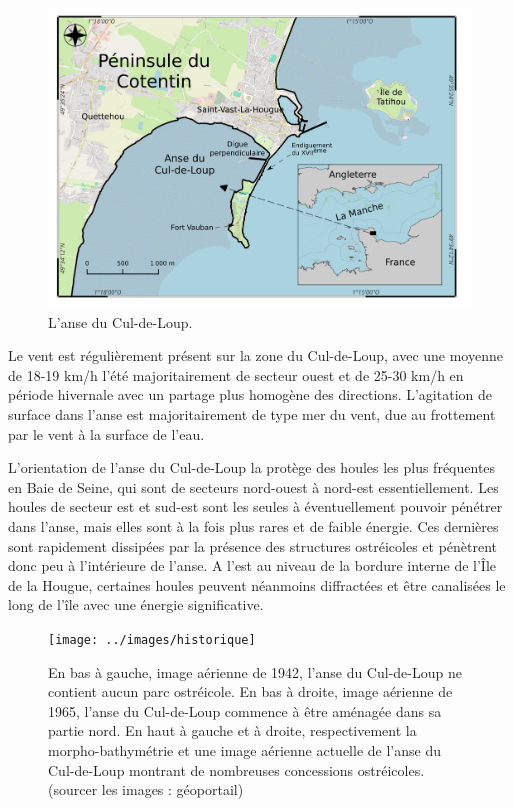 \documentclass[10pt,a4paper,titlepage]{article}
\begin{document}
\begin{figure}[!h]
    \centering
    \includegraphics[width=0.8\linewidth]{../images/carte-ADCL}
    \caption[Anse du Cul-de-Loup.]{L'anse du Cul-de-Loup.}
    \label{fig:carte-adcl}
\end{figure}

Le vent est régulièrement présent sur la zone du Cul-de-Loup, avec une moyenne de 18-19 km/h l'été majoritairement de secteur ouest et de 25-30 km/h en période hivernale avec un partage plus homogène des directions. L'agitation de surface dans l'anse est majoritairement de type mer du vent, due au frottement par le vent à la surface de l'eau.

L'orientation de l'anse du Cul-de-Loup la protège des houles les plus fréquentes en Baie de Seine, qui sont de secteurs nord-ouest à nord-est essentiellement. Les houles de secteur est et sud-est sont les seules à éventuellement pouvoir pénétrer dans l'anse, mais elles sont à la fois plus rares et de faible énergie. Ces dernières sont rapidement dissipées par la présence des structures ostréicoles et pénètrent donc peu à l'intérieure de l'anse. A l'est au niveau de la bordure interne de l'Île de la Hougue, certaines houles peuvent néanmoins diffractées et être canalisées le long de l'île avec une énergie significative.

\begin{figure}[!h]
    \centering
    \texttt{[image: ../images/historique]}
    \caption[Évolution de l'anse du Cul-de-Loup]{En bas à gauche, image aérienne de 1942, l'anse du Cul-de-Loup ne contient aucun parc ostréicole. En bas à droite, image aérienne de 1965, l'anse du Cul-de-Loup commence à être aménagée dans sa partie nord. En haut à gauche et à droite, respectivement la morpho-bathymétrie  et une image aérienne actuelle de l'anse du Cul-de-Loup montrant de nombreuses concessions ostréicoles. (sourcer les images : géoportail)}
    \label{fig:historique-adcl}
\end{figure}
\end{document}
